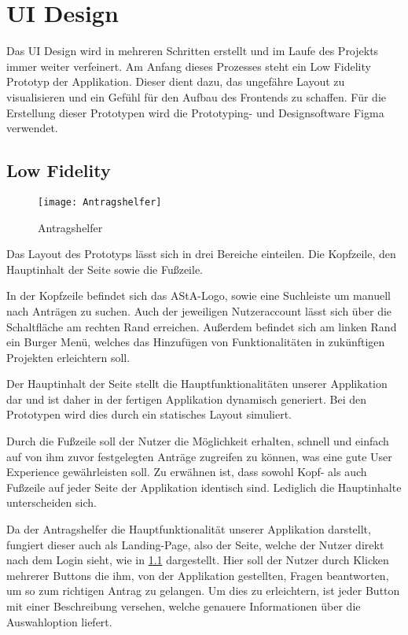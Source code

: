 \chapter{UI Design}\label{ch:ui-design}
Das UI Design wird in mehreren Schritten erstellt und im Laufe des Projekts immer weiter
verfeinert. Am Anfang dieses Prozesses steht ein Low Fidelity Prototyp der Applikation.
Dieser dient dazu, das ungefähre Layout zu visualisieren und ein Gefühl für den Aufbau
des Frontends zu schaffen. Für die Erstellung dieser Prototypen wird die Prototyping- und
Designsoftware Figma verwendet.

\section{Low Fidelity}\label{Low Fidelity}
\begin{figure}[h]
  \centering
    \texttt{[image: Antragshelfer]}
    \caption{Antragshelfer}\label{Antragshelfer}
\end{figure}
Das Layout des Prototyps lässt sich in drei Bereiche einteilen. Die Kopfzeile, den
Hauptinhalt der Seite sowie die Fußzeile.

In der Kopfzeile befindet sich das AStA-Logo, sowie eine Suchleiste um manuell nach
Anträgen zu suchen. Auch der jeweiligen Nutzeraccount lässt sich über die Schaltfläche
am rechten Rand erreichen. Außerdem befindet sich am linken Rand ein Burger Menü,
welches das Hinzufügen von Funktionalitäten in zukünftigen Projekten erleichtern soll.

Der Hauptinhalt der Seite stellt die Hauptfunktionalitäten unserer Applikation dar und
ist daher in der fertigen Applikation dynamisch generiert. Bei den Prototypen wird dies
durch ein statisches Layout simuliert.

Durch die Fußzeile soll der Nutzer die Möglichkeit erhalten, schnell und einfach auf von
ihm zuvor festgelegten Anträge zugreifen zu können, was eine gute User Experience
gewährleisten soll. Zu erwähnen ist, dass sowohl Kopf- als auch Fußzeile auf jeder Seite
der Applikation identisch sind. Lediglich die Hauptinhalte unterscheiden sich.

Da der Antragshelfer die Hauptfunktionalität unserer Applikation darstellt, fungiert
dieser auch als Landing-Page, also der Seite, welche der Nutzer direkt nach dem Login
sieht, wie in \ref{Antragshelfer} dargestellt. Hier soll der Nutzer durch Klicken mehrerer Buttons die
ihm, von der Applikation gestellten, Fragen beantworten, um so zum richtigen Antrag zu
gelangen. Um dies zu erleichtern, ist jeder Button mit einer Beschreibung versehen, welche genauere Informationen über die Auswahloption liefert.

